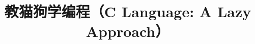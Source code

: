 
\title{教猫狗学编程（C Language: A Lazy Approach）}


\newtheorem{theorem}{定理}[chapter]
\newtheorem{definition}[theorem]{定义}
\newtheorem{lemma}[theorem]{引理}
\renewcommand{\proofname}{证明}

\newcommand\lazyfooteven{C Language: A Lazy Approach}
\newcommand\lazyfooterodd{教猫狗学编程}
\newcommand\lazyfooteropener{C Language: A Lazy Approach\quad 教猫狗学编程}

\newcommand\BackCoverAuthorTitle{关于作者}
\newcommand\BackCoverAuthor{%
  whensungoesdown 从C语言学到rootkit，有两篇Phrack文章，写过一个能运行Linux的CPU，
  现在还在追那只小白兔。Ray（狗）和Summer（猫）受邀审读了这本书。他们没有读。}

